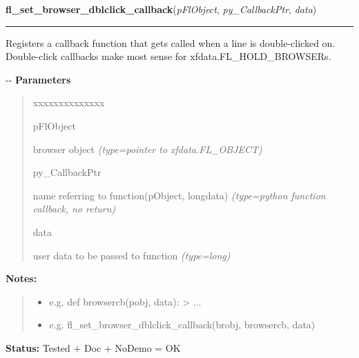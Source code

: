 \hspace{.8\funcindent}\begin{boxedminipage}{\funcwidth}

    \raggedright \textbf{fl\_set\_browser\_dblclick\_callback}(\textit{pFlObject}, \textit{py\_CallbackPtr}, \textit{data})

    \vspace{-1.5ex}

    \rule{\textwidth}{0.5\fboxrule}
\setlength{\parskip}{2ex}

Registers a callback function that gets called when a line is
double-clicked on. Double-click callbacks make most sense for
xfdata.FL\_HOLD\_BROWSERs.

-{}-
\setlength{\parskip}{1ex}
      \textbf{Parameters}
      \vspace{-1ex}

      \begin{quote}
        \begin{Ventry}{xxxxxxxxxxxxxx}

          \item[pFlObject]


browser object
            {\it (type=pointer to xfdata.FL\_OBJECT)}

          \item[py\_CallbackPtr]


name referring to function(pObject, longdata)
            {\it (type=python function callback, no return)}

          \item[data]


user data to be passed to function
            {\it (type=long)}

        \end{Ventry}

      \end{quote}

\textbf{Notes:}
\begin{quote}
  \begin{itemize}

  \item
    \setlength{\parskip}{0.6ex}

e.g. def browsercb(pobj, data): > ...


  \item 
e.g. fl\_set\_browser\_dblclick\_callback(brobj, browsercb, data)


\end{itemize}

\end{quote}

\textbf{Status:} 
Tested + Doc + NoDemo = OK


    \end{boxedminipage}

